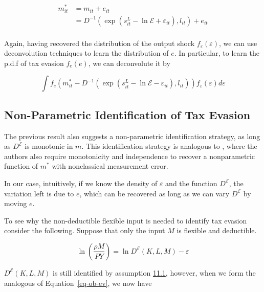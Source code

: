 \documentclass[
  12pt]{article}
\theoremstyle{definition}
\theoremstyle{remark}
\begin{document}
\[
\begin{aligned}
    m^*_{it}&=m_{it}+e_{it}\\
    &=D^{-1}(\exp(s^L_{it}-\ln\mathcal{E}+\varepsilon_{it}),l_{it})+e_{it}\\
\end{aligned}
\]

Again, having recovered the distribution of the output shock
\(f_{\varepsilon}(\varepsilon)\), we can use deconvolution techniques to
learn the distribution of \(e\). In particular, to learn the p.d.f of
tax evasion \(f_e(e)\), we can deconvolute it by

\[
    \int f_e(m^*_{it}-D^{-1}(\exp(s^L_{it}-\ln\mathcal{E}-\varepsilon_{it}),l_{it})) f_{\varepsilon}(\varepsilon)d\varepsilon
\]

\subsection{Non-Parametric Identification of Tax
Evasion}\label{non-parametric-identification-of-tax-evasion}

The previous result also suggests a non-parametric identification
strategy, as long as \(D^{\mathcal{E}}\) is monotonic in \(m\). This
identification strategy is analogous to \citet{Hu2022b}, where the
authors also require monotonicity and independence to recover a
nonparametric function of \(m^*\) with nonclassical measurement error.

In our case, intuitively, if we know the density of \(\varepsilon\) and
the function \(D^{\mathcal{E}}\), the variation left is due to \(e\),
which can be recovered as long as we can vary \(D^{\mathcal{E}}\) by
moving \(e\).

To see why the non-deductible flexible input is needed to identify tax
evasion consider the following. Suppose that only the input \(M\) is
flexible and deductible.

\[
\ln\left(\frac{\rho M}{PY}\right)=\ln D^{\mathcal{E}}(K,L,M)-\varepsilon
\]

\(D^{\mathcal{E}}(K,L,M)\) is still identified by assumption
\hyperref[ass-non-ev]{11.1}, however, when we form the analogous of
Equation~\ref{eq-ob-ev}, we now have
\end{document}
